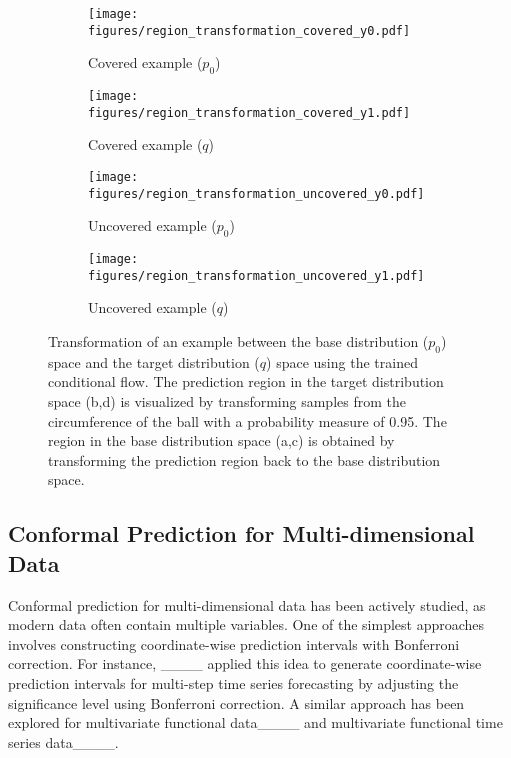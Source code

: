 \begin{figure*}[htb]
    \centering
    \begin{subfigure}[b]{0.32\textwidth}
    \texttt{[image: figures/region\_transformation\_covered\_y0.pdf]}
        \caption{Covered example ($p_0$)}
        \label{fig:covered_y0}
    \end{subfigure}
    \begin{subfigure}[b]{0.32\textwidth}
    \texttt{[image: figures/region\_transformation\_covered\_y1.pdf]}
    \caption{Covered example ($q$)}
    \label{fig:covered_y1}
    \end{subfigure}
    
    \vspace{0.5cm}
    \begin{subfigure}[b]{0.32\textwidth}
    \texttt{[image: figures/region\_transformation\_uncovered\_y0.pdf]}
        \caption{Uncovered example ($p_0$)}
        \label{fig:uncovered_y0}
    \end{subfigure}
    \begin{subfigure}[b]{0.32\textwidth}
        \texttt{[image: figures/region\_transformation\_uncovered\_y1.pdf]}
        \caption{Uncovered example ($q$)}
        \label{fig:uncovered_y1}
    \end{subfigure}
    \caption{Transformation of an example between the base distribution ($p_0$) space and the target distribution ($q$) space using the trained conditional flow. The prediction region in the target distribution space (b,d) is visualized by transforming samples from the circumference of the ball with a probability measure of 0.95. The region in the base distribution space (a,c) is obtained by transforming the prediction region back to the base distribution space.}
    \label{fig:transformation}
\end{figure*}

\subsection{Conformal Prediction for Multi-dimensional Data}

Conformal prediction for multi-dimensional data has been actively studied, as modern data often contain multiple variables. One of the simplest approaches involves constructing coordinate-wise prediction intervals with Bonferroni correction. For instance, ____ applied this idea to generate coordinate-wise prediction intervals for multi-step time series forecasting by adjusting the significance level using Bonferroni correction. A similar approach has been explored for multivariate functional data____ and multivariate functional time series data____.

